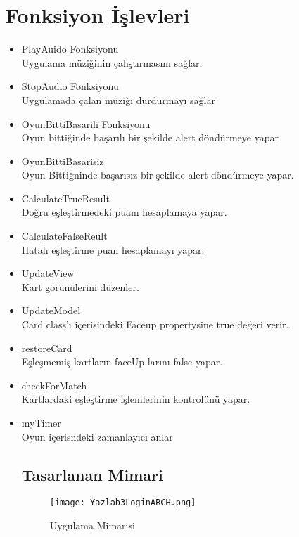 \documentclass[conference]{IEEEtran}
\begin{document}
\section{Fonksiyon İşlevleri}

\begin{itemize}
    \item PlayAuido Fonksiyonu\\
    Uygulama müziğinin çalıştırmasını sağlar.\\
    \item StopAudio Fonksiyonu\\
    Uygulamada çalan müziği durdurmayı sağlar\\
    \item OyunBittiBasarili Fonksiyonu\\
    Oyun bittiğinde başarılı bir şekilde alert döndürmeye yapar\\
    \item OyunBittiBasarisiz\\
    Oyun Bittiğninde başarısız bir şekilde alert döndürmeye yapar.\\
    \item CalculateTrueResult\\
    Doğru eşleştirmedeki puanı hesaplamaya yapar.\\
    \item CalculateFalseReult\\
    Hatalı eşleştirme puan hesaplamayı yapar.\\
    \item UpdateView\\
    Kart görünülerini düzenler.
    \item UpdateModel\\
    Card class'ı içerisindeki Faceup propertysine true değeri verir.
    \item restoreCard\\
    Eşleşmemiş kartların faceUp larını false yapar.\\
    \item checkForMatch\\
    Kartlardaki eşleştirme işlemlerinin kontrolünü yapar.\\
    \item myTimer\\
    Oyun içerisndeki zamanlayıcı anlar

    
\subsection{Tasarlanan Mimari}

\begin{figure}[ht] 
    \centering
    \texttt{[image: Yazlab3LoginARCH.png]}
    \caption{Uygulama Mimarisi}
    \label{fig:spark}
\end{figure}

    
\end{itemize}
\end{document}
